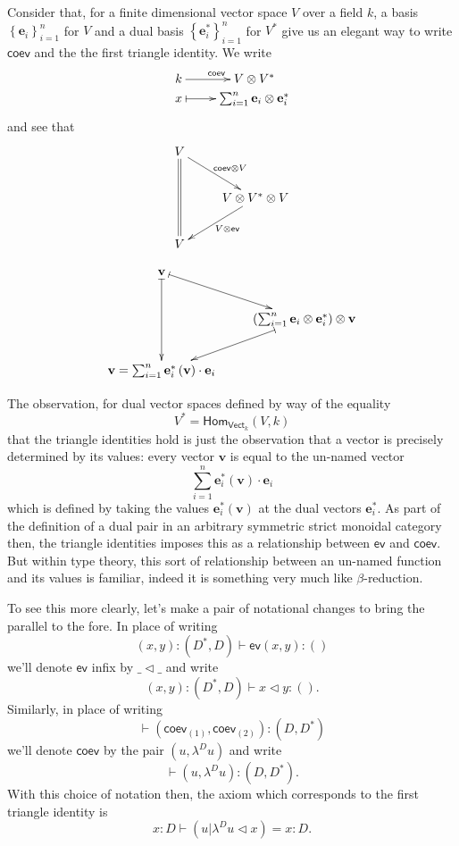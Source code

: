 \documentclass[pra,floatfix,
amsmath,superscriptaddress, 12pt]{article}
\theoremstyle{definition}
\newcommand{\evmap}{\mathsf{ev}}
\newcommand{\coev}{\mathsf{coev}}
\begin{document}
\par

Consider that, for a finite dimensional vector space $V$ over a field
$k$, a basis $\left\{ \mathbf{e}_{i}\right\} _{i=1}^{n}$ for $V$
and a dual basis $\left\{ \mathbf{e}_{i}^{*}\right\} _{i=1}^{n}$
for $V^{*}$ give us an elegant way to write $\coev$ and the the
first triangle identity. We write
\[
\xymatrixrowsep{0pc}\xymatrix{k\ar[r]^{\coev} & V\otimes V^{*}\\
x\ar@{|->}[r] & \sum_{i=1}^{n}\mathbf{e}_{i}\otimes\mathbf{e}_{i}^{*}
}
\]
and see that
\[
\begin{split}\vcenter{\vbox{\xymatrix{V\ar@{=}[dd]\ar[dr]^{\coev\otimes V}\\
 & V\otimes V^{*}\otimes V\ar[dl]^{V\otimes\evmap}\\
V
}
}}
\end{split}
\]

\[
\vcenter{\vbox{\xymatrix{\mathbf{v}\ar@{|->}[dd]\ar@{|->}[dr]\\
 & \left(\sum_{i=1}^{n}\mathbf{e}_{i}\otimes\mathbf{e}_{i}^{*}\right)\otimes\mathbf{v}\ar@{|->}[dl]\\
\mathbf{v}=\sum_{i=1}^{n}\mathbf{e}_{i}^{*}\left(\mathbf{v}\right)\cdot\mathbf{e}_{i}
}
}}
\]

\par

The observation, for dual vector spaces defined by way of the equality \[
V^*=\mathsf{Hom}_{\mathsf{Vect}_k}\left(V,k \right)
\]
that the triangle identities hold is just the observation that a vector is precisely determined by its values: every vector $\mathbf{v}$  is equal to the un-named vector
\[
\sum_{i=1}^{n}\mathbf{e}_i^*\left( \mathbf{v}\right)\cdot \mathbf{e}_i
\]
which is defined by taking the values $\mathbf{e}^*_{i}\left( \mathbf{v} \right)$ at the dual vectors $\mathbf{e}_i^*$.
As part of the definition of a dual pair in an arbitrary symmetric strict monoidal category then, the triangle identities imposes this as a relationship between $\evmap$ and $\coev$. But within type theory, this sort of relationship between an un-named function and its values is familiar, indeed it is something very much like $\beta$-reduction.

\par To see this more clearly, let's make a pair of notational changes
to bring the parallel to the fore. In place of writing 
\[
\left(x,y\right):\left(D^{*},D\right)\vdash\evmap\left(x,y\right):\left(\right)
\]
we'll denote $\evmap$ infix by $\_\triangleleft\_$ and write
\[
\left(x,y\right):\left(D^{*},D\right)\vdash x\triangleleft y:\left(\right).
\]
Similarly, in place of writing 
\[
\vdash\left(\coev_{\left(1\right)},\coev_{\left(2\right)}\right):\left(D,D^{*}\right)
\]
 we'll denote $\coev$ by the pair $\left(u,\lambda^{D}u\right)$
and write
\[
\vdash\left(u,\lambda^{D}u\right):\left(D,D^{*}\right).
\]
With this choice of notation then, the axiom which corresponds to
the first triangle identity is 
\[
x:D\vdash\left( u | \lambda^{D}u\triangleleft x\right)=x:D.
\]
\end{document}
